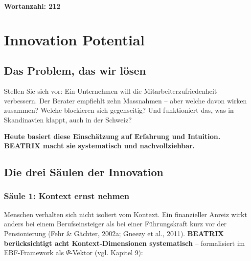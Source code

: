 \documentclass[11pt,a4paper]{article}
\begin{document}
\textbf{Wortanzahl: 212}

\newpage


\section{Innovation Potential}

\subsection{Das Problem, das wir lösen}

Stellen Sie sich vor: Ein Unternehmen will die Mitarbeiterzufriedenheit verbessern. Der Berater empfiehlt zehn Massnahmen -- aber welche davon wirken zusammen? Welche blockieren sich gegenseitig? Und funktioniert das, was in Skandinavien klappt, auch in der Schweiz?

\textbf{Heute basiert diese Einschätzung auf Erfahrung und Intuition. BEATRIX macht sie systematisch und nachvollziehbar.}

\subsection{Die drei Säulen der Innovation}

\subsubsection{Säule 1: Kontext ernst nehmen}

Menschen verhalten sich nicht isoliert vom Kontext. Ein finanzieller Anreiz wirkt anders bei einem Berufseinsteiger als bei einer Führungskraft kurz vor der Pensionierung (Fehr \& Gächter, 2002a; Gneezy et al., 2011). \textbf{BEATRIX berücksichtigt acht Kontext-Dimensionen systematisch} -- formalisiert im EBF-Framework als $\Psi$-Vektor (vgl. Kapitel 9):
\end{document}
